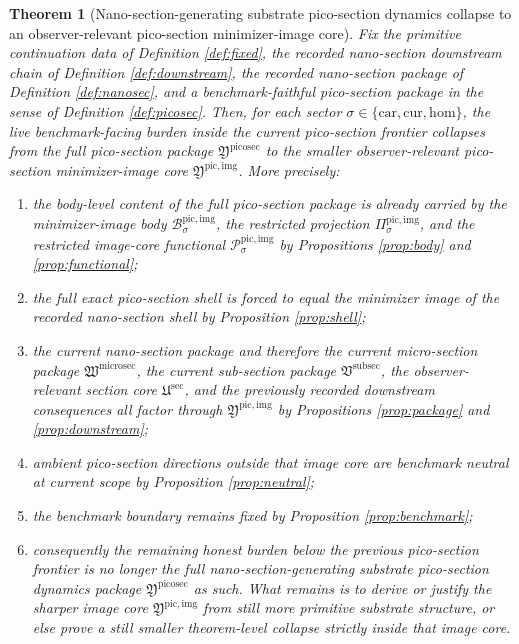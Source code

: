 \documentclass[11pt]{article}
\newcommand{\Car}{\mathrm{car}}
\newcommand{\Cur}{\mathrm{cur}}
\newcommand{\Hom}{\mathrm{hom}}
\newcommand{\SubSectionPackage}{\mathfrak V^{\mathrm{subsec}}}
\newcommand{\MicroSectionPackage}{\mathfrak W^{\mathrm{microsec}}}
\newcommand{\SubPreSectionCore}{\mathfrak U^{\mathrm{sec}}}
\newcommand{\PicoSectionPackage}{\mathfrak Y^{\mathrm{picosec}}}
\newcommand{\PicoImageCore}{\mathfrak Y^{\mathrm{pic,img}}}
\newcommand{\PicoImgBody}[1]{\mathcal B_{#1}^{\mathrm{pic,img}}}
\newcommand{\PicoImgProj}[1]{\Pi_{#1}^{\mathrm{pic,img}}}
\newcommand{\PicoImgFunctional}[1]{\mathscr P_{#1}^{\mathrm{pic,img}}}
\newtheorem{theorem}{Theorem}
\begin{document}
\begin{theorem}[Nano-section-generating substrate pico-section dynamics collapse to an observer-relevant pico-section minimizer-image core]
\label{thm:main}
Fix the primitive continuation data of Definition \ref{def:fixed}, the recorded nano-section downstream chain of Definition \ref{def:downstream}, the recorded nano-section package of Definition \ref{def:nanosec}, and a benchmark-faithful pico-section package in the sense of Definition \ref{def:picosec}. Then, for each sector \(\sigma\in\{\Car,\Cur,\Hom\}\), the live benchmark-facing burden inside the current pico-section frontier collapses from the full pico-section package \(\PicoSectionPackage\) to the smaller observer-relevant pico-section minimizer-image core \(\PicoImageCore\). More precisely:
\begin{enumerate}
    \item the body-level content of the full pico-section package is already carried by the minimizer-image body \(\PicoImgBody{\sigma}\), the restricted projection \(\PicoImgProj{\sigma}\), and the restricted image-core functional \(\PicoImgFunctional{\sigma}\) by Propositions \ref{prop:body} and \ref{prop:functional};
    \item the full exact pico-section shell is forced to equal the minimizer image of the recorded nano-section shell by Proposition \ref{prop:shell};
    \item the current nano-section package and therefore the current micro-section package \(\MicroSectionPackage\), the current sub-section package \(\SubSectionPackage\), the observer-relevant section core \(\SubPreSectionCore\), and the previously recorded downstream consequences all factor through \(\PicoImageCore\) by Propositions \ref{prop:package} and \ref{prop:downstream};
    \item ambient pico-section directions outside that image core are benchmark neutral at current scope by Proposition \ref{prop:neutral};
    \item the benchmark boundary remains fixed by Proposition \ref{prop:benchmark};
    \item consequently the remaining honest burden below the previous pico-section frontier is no longer the full nano-section-generating substrate pico-section dynamics package \(\PicoSectionPackage\) as such. What remains is to derive or justify the sharper image core \(\PicoImageCore\) from still more primitive substrate structure, or else prove a still smaller theorem-level collapse strictly inside that image core.
\end{enumerate}
\end{theorem}
\end{document}
